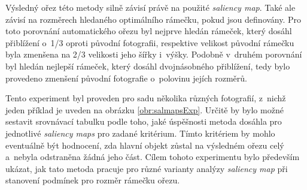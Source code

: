 Výsledný ořez této metody silně závisí právě na použité \emph{saliency map}. Také ale závisí na rozměrech hledaného optimálního rámečku, pokud jsou definovány. Pro toto porovnání automatického ořezu byl nejprve hledán rámeček, který dosáhl přiblížení o~1/3 oproti původní fotografii, respektive velikost původní rámečku byla zmenšena na 2/3 velikosti jeho šířky i~výšky. Podobně v~druhém porovnání byl hledán nejlepší rámeček, který dosáhl dvojnásobného přiblížení, tedy bylo provedeno zmenšení původní fotografie o~polovinu jejích rozměrů.

Tento experiment byl proveden pro sadu několika různých fotografií, z~nichž jeden příklad je uveden na obrázku \ref{obr:salmapsExp}. Určitě by bylo možné sestavit srovnávací tabulku podle toho, jaké úspěšnosti metoda dosáhla pro jednotlivé \emph{saliency maps} pro zadané kritérium. Tímto kritériem by mohlo eventuálně být hodnocení, zda hlavní objekt zůstal na výsledném ořezu celý a~nebyla odstraněna žádná jeho část. Cílem tohoto experimentu bylo především ukázat, jak tato metoda pracuje pro různé varianty analýzy \emph{saliency map} při stanovení podmínek pro rozměr rámečku ořezu.

